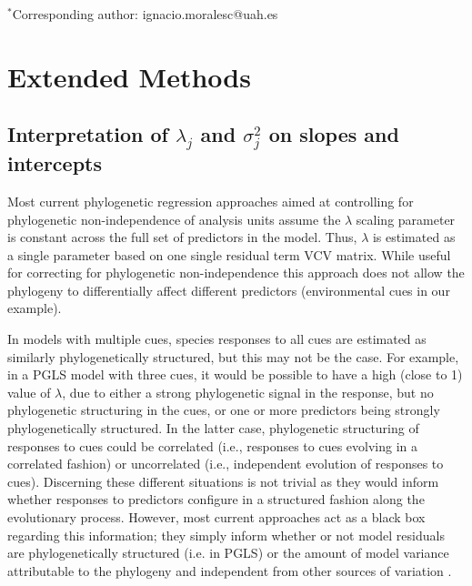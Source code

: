 \documentclass[11pt]{article}
\def\labelitemi{--}
\begin{document}
\vspace{2ex}
$^*$Corresponding author: ignacio.moralesc@uah.es\\
\renewcommand{\thetable}{S\arabic{table}}
\renewcommand{\thefigure}{S\arabic{figure}}
\renewcommand{\labelitemi}{$-$}

\clearpage



\section*{Extended Methods}

\subsection*{Interpretation of $\lambda_j$ and $\sigma_j^2$ on slopes and intercepts}

Most current phylogenetic regression approaches aimed at controlling for phylogenetic non-independence of analysis units \citep[i.e. species, see][]{revell2010phylogenetic} assume the $\lambda$ scaling parameter is constant across the full set of predictors in the model. Thus, $\lambda$ is estimated as a single parameter based on one single residual term VCV matrix. While useful for correcting for phylogenetic non-independence this approach does not allow the phylogeny to differentially affect different predictors (environmental cues in our example). 

In models with multiple cues, species responses to all cues are estimated as similarly phylogenetically structured, but this may not be the case. For example, in a PGLS model with three cues, it would be possible to have a high (close to 1) value of $\lambda$, due to either a strong phylogenetic signal in the response, but no phylogenetic structuring in the cues, or one or more predictors being strongly phylogenetically structured. In the latter case, phylogenetic structuring of responses to cues could be correlated (i.e., responses to cues evolving in a correlated fashion) or uncorrelated (i.e., independent evolution of responses to cues). Discerning these different situations is not trivial as they would inform whether responses to predictors configure in a structured fashion along the evolutionary process. However, most current approaches act as a black box regarding this information; they simply inform whether or not model residuals are phylogenetically structured (i.e. in PGLS) or the amount of model variance attributable to the phylogeny and independent from other sources of variation \citep[i.e., in PMM, see][]{housworth2004phylogenetic}.
\end{document}
